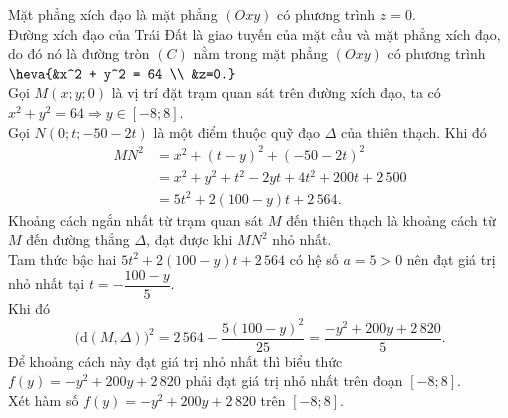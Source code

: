 \begin{ex}
{\begin{center}
		\end{center}
		Mặt phẳng xích đạo là mặt phẳng $(Oxy)$ có phương trình $z = 0$.\\
		Đường xích đạo của Trái Đất là giao tuyến của mặt cầu và mặt phẳng xích đạo, do đó nó là đường tròn $(C)$ nằm trong mặt phẳng $(Oxy)$ có phương trình $\heva{&x^2 + y^2 = 64 \\ &z=0.}$\\
		Gọi $M(x;y;0)$ là vị trí đặt trạm quan sát trên đường xích đạo, ta có $x^2 + y^2 = 64 \Rightarrow y \in [-8;8]$.\\
		Gọi $N(0;t;-50-2t)$ là một điểm thuộc quỹ đạo $\Delta$ của thiên thạch.
		Khi đó
		\begin{align*}
			MN^2 &= x^2 + (t - y)^2 + (-50 - 2t)^2 \\
			&= x^2 + y^2 + t^2 - 2yt + 4t^2 + 200t + 2\,500 \\
			&= 5t^2 + 2(100 - y)t + 2\,564.
		\end{align*}
		Khoảng cách ngắn nhất từ trạm quan sát $M$ đến thiên thạch là khoảng cách từ $M$ đến đường thẳng $\Delta$, đạt được khi $MN^2$ nhỏ nhất.\\
		Tam thức bậc hai $5t^2 + 2(100 - y)t + 2\,564$ có hệ số $a = 5 > 0$ nên đạt giá trị nhỏ nhất tại $t = -\dfrac{100 - y}{5}$.\\
		Khi đó
		\[\big(\mathrm{d}(M, \Delta)\big)^2 = 2\,564 - \dfrac{5(100 - y)^2}{25} = \dfrac{-y^2 + 200y + 2\,820}{5}. \]
		Để khoảng cách này đạt giá trị nhỏ nhất thì biểu thức $f(y) = -y^2 + 200y + 2\,820$ phải đạt giá trị nhỏ nhất trên đoạn $[-8;8]$.\\
		Xét hàm số $f(y) = -y^2 + 200y + 2\,820$ trên $[-8;8]$.\\
}
\end{ex}
